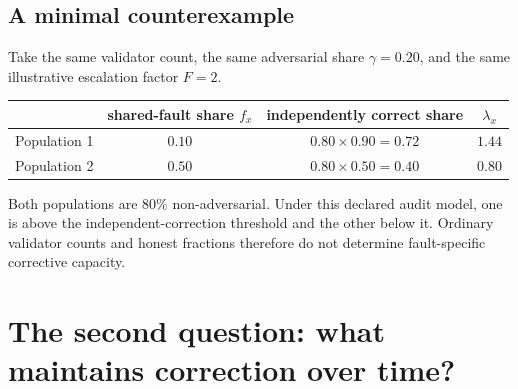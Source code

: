 \documentclass[10pt,a4paper]{article}
\begin{document}
\subsection{A minimal counterexample}

Take the same validator count, the same adversarial share $\gamma=0.20$, and the same illustrative escalation factor $F=2$.

\begin{center}
\small
\begin{tabular}{@{}lccc@{}}
\toprule
 & shared-fault share $f_x$ & independently correct share & $\lambda_x$ \\
\midrule
Population 1 & $0.10$ & $0.80\times0.90=0.72$ & $1.44$ \\
Population 2 & $0.50$ & $0.80\times0.50=0.40$ & $0.80$ \\
\bottomrule
\end{tabular}
\end{center}

Both populations are 80\% non-adversarial. Under this declared audit model, one is above the independent-correction threshold and the other below it. Ordinary validator counts and honest fractions therefore do not determine fault-specific corrective capacity.

\begin{center}
\end{center}

\section{The second question: what maintains correction over time?}
\end{document}
